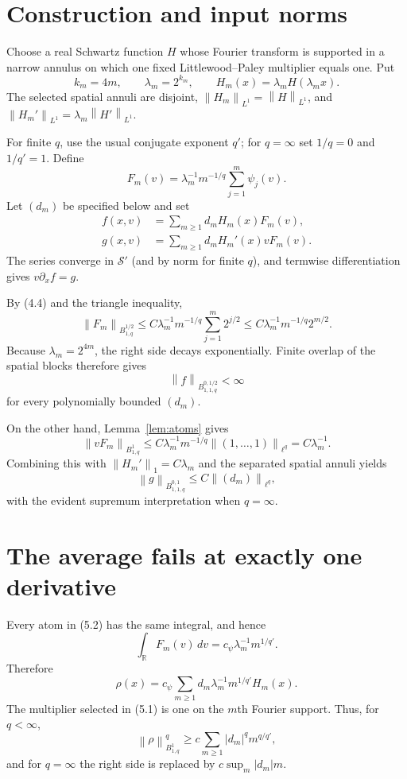 \documentclass[11pt]{article}
\newcommand{\norm}[1]{\left\lVert#1\right\rVert}
\newcommand{\R}{\mathbb R}
\begin{document}
\section{Construction and input norms}

Choose a real Schwartz function $H$ whose Fourier transform is supported in
a narrow annulus on which one fixed Littlewood--Paley multiplier equals one.
Put
\[
 k_m=4m,\qquad \lambda_m=2^{k_m},\qquad
 H_m(x)=\lambda_mH(\lambda_mx).                           \tag{5.1}
\]
The selected spatial annuli are disjoint,
$\norm{H_m}_{L^1}=\norm H_{L^1}$, and
$\norm{H_m'}_{L^1}=\lambda_m\norm{H'}_{L^1}$.

For finite $q$, use the usual conjugate exponent $q'$; for $q=\infty$ set
$1/q=0$ and $1/q'=1$.  Define
\[
 F_m(v)=\lambda_m^{-1}m^{-1/q}\sum_{j=1}^m\psi_j(v).      \tag{5.2}
\]
Let $(d_m)$ be specified below and set
\begin{align}
 f(x,v)&=\sum_{m\ge1}d_mH_m(x)F_m(v),                    \tag{5.3}\\
 g(x,v)&=\sum_{m\ge1}d_mH_m'(x)vF_m(v).                  \tag{5.4}
\end{align}
The series converge in $\mathcal S'$ (and by norm for finite $q$), and
termwise differentiation gives $v\partial_xf=g$.

By (4.4) and the triangle inequality,
\[
 \norm{F_m}_{B^{1/2}_{1,q}}
 \le C\lambda_m^{-1}m^{-1/q}\sum_{j=1}^m2^{j/2}
 \le C\lambda_m^{-1}m^{-1/q}2^{m/2}.                    \tag{5.5}
\]
Because $\lambda_m=2^{4m}$, the right side decays exponentially.  Finite
overlap of the spatial blocks therefore gives
\[
 \norm f_{B^{0,1/2}_{1,1,q}}<\infty                       \tag{5.6}
\]
for every polynomially bounded $(d_m)$.

On the other hand, Lemma~\ref{lem:atoms} gives
\[
 \norm{vF_m}_{B^1_{1,q}}
 \le C\lambda_m^{-1}m^{-1/q}
        \norm{(1,\ldots,1)}_{\ell^q}
 =C\lambda_m^{-1}.                                      \tag{5.7}
\]
Combining this with $\norm{H_m'}_1=C\lambda_m$ and the separated spatial
annuli yields
\[
 \norm g_{B^{0,1}_{1,1,q}}
 \le C\norm{(d_m)}_{\ell^q},                             \tag{5.8}
\]
with the evident supremum interpretation when $q=\infty$.

\section{The average fails at exactly one derivative}

Every atom in (5.2) has the same integral, and hence
\[
 \int_\R F_m(v)\,dv
 =c_\psi\lambda_m^{-1}m^{1/q'}.                          \tag{6.1}
\]
Therefore
\[
 \rho(x)=c_\psi\sum_{m\ge1}
 d_m\lambda_m^{-1}m^{1/q'}H_m(x).                        \tag{6.2}
\]
The multiplier selected in (5.1) is one on the $m$th Fourier support.  Thus,
for $q<\infty$,
\[
 \norm\rho_{B^1_{1,q}}^q
 \ge c\sum_{m\ge1}|d_m|^qm^{q/q'},                      \tag{6.3}
\]
and for $q=\infty$ the right side is replaced by
$c\sup_m|d_m|m$.
\end{document}
